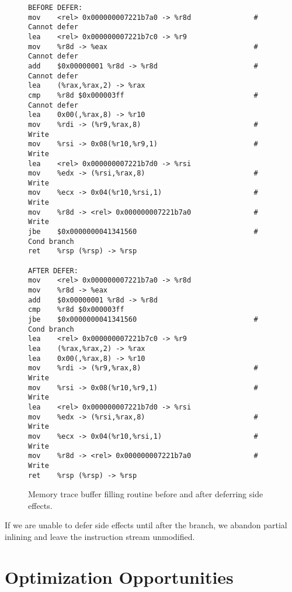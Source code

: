 \begin{figure}
\begin{verbatim}
BEFORE DEFER:
mov    <rel> 0x000000007221b7a0 -> %r8d               # Cannot defer
lea    <rel> 0x000000007221b7c0 -> %r9
mov    %r8d -> %eax                                   # Cannot defer
add    $0x00000001 %r8d -> %r8d                       # Cannot defer
lea    (%rax,%rax,2) -> %rax
cmp    %r8d $0x000003ff                               # Cannot defer
lea    0x00(,%rax,8) -> %r10
mov    %rdi -> (%r9,%rax,8)                           # Write
mov    %rsi -> 0x08(%r10,%r9,1)                       # Write
lea    <rel> 0x000000007221b7d0 -> %rsi
mov    %edx -> (%rsi,%rax,8)                          # Write
mov    %ecx -> 0x04(%r10,%rsi,1)                      # Write
mov    %r8d -> <rel> 0x000000007221b7a0               # Write
jbe    $0x0000000041341560                            # Cond branch
ret    %rsp (%rsp) -> %rsp

AFTER DEFER:
mov    <rel> 0x000000007221b7a0 -> %r8d
mov    %r8d -> %eax
add    $0x00000001 %r8d -> %r8d
cmp    %r8d $0x000003ff
jbe    $0x0000000041341560                            # Cond branch
lea    <rel> 0x000000007221b7c0 -> %r9
lea    (%rax,%rax,2) -> %rax
lea    0x00(,%rax,8) -> %r10
mov    %rdi -> (%r9,%rax,8)                           # Write
mov    %rsi -> 0x08(%r10,%r9,1)                       # Write
lea    <rel> 0x000000007221b7d0 -> %rsi
mov    %edx -> (%rsi,%rax,8)                          # Write
mov    %ecx -> 0x04(%r10,%rsi,1)                      # Write
mov    %r8d -> <rel> 0x000000007221b7a0               # Write
ret    %rsp (%rsp) -> %rsp
\end{verbatim}
\caption{Memory trace buffer filling routine before and after deferring side
effects.}
\label{fig:memtrace_defer}
\end{figure}

If we are unable to defer side effects until after the branch, we abandon
partial inlining and leave the instruction stream unmodified.

\section{Optimization Opportunities}

